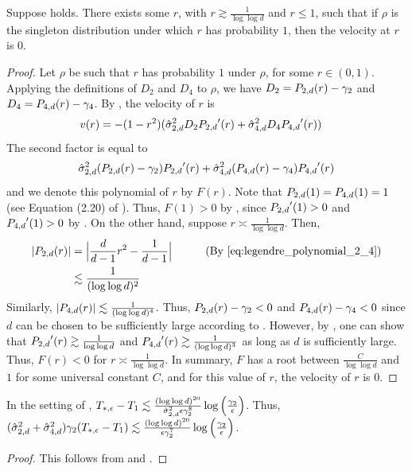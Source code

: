 \begin{lemma} \label{lemma:saddle_point_construction}
Suppose  holds. There exists some $r$, with $r \gtrsim \frac{1}{\log \log d}$ and $r \leq 1$, such that if $\rho$ is the singleton distribution under which $r$ has probability $1$, then the velocity at $r$ is $0.$
\end{lemma}
\begin{proof}
Let $\rho$ be such that $r$ has probability $1$ under $\rho$, for some $r \in (0, 1)$. Applying the definitions of $D_2$ and $D_4$ to $\rho$, we have $D_2 = {P_{2, d}}(r) - \gamma_2$ and $D_4 = {P_{4, d}}(r) - \gamma_4$. By , the velocity of $r$ is
\begin{align}
v(r)
& = -(1 - r^2) (\hat{\sigma}_{2, d}^2 D_2 {P_{2, d}}'(r) + \hat{\sigma}_{4, d}^2 D_4 {P_{4, d}}'(r))
\end{align}
The second factor is equal to
\begin{align}
\hat{\sigma}_{2, d}^2 ({P_{2, d}}(r) - \gamma_2) {P_{2, d}}'(r) + \hat{\sigma}_{4, d}^2 ({P_{4, d}}(r) - \gamma_4) {P_{4, d}}'(r)
\end{align}
and we denote this polynomial of $r$ by $F(r)$. Note that ${P_{2, d}}(1) = {P_{4, d}}(1) = 1$ (see Equation (2.20) of \citet{atkinson2012spherical}). Thus, $F(1) > 0$ by , since ${P_{2, d}}'(1) > 0$ and ${P_{4, d}}'(1) > 0$ by . On the other hand, suppose $r \asymp \frac{1}{\log \log d}$. Then,
\begin{align}
|\PtwoD(r)|
& = \Big|\frac{d}{d - 1} r^2 - \frac{1}{d - 1}\Big|
& \tag{By \Cref{eq:legendre_polynomial_2_4}} \\
& \lesssim \frac{1}{(\log \log d)^2}
\end{align}
Similarly, $|{P_{4, d}}(r)| \lesssim \frac{1}{(\log \log d)^4}$. Thus, ${P_{2, d}}(r) - \gamma_2 < 0$ and ${P_{4, d}}(r) - \gamma_4 < 0$ since $d$ can be chosen to be sufficiently large according to . However, by , one can show that ${P_{2, d}}'(r) \gtrsim \frac{1}{\log \log d}$ and ${P_{4, d}}'(r) \gtrsim \frac{1}{(\log \log d)^3}$ as long as $d$ is sufficiently large. Thus, $F(r) < 0$ for $r \asymp \frac{1}{\log \log d}$. In summary, $F$ has a root between $\frac{C}{\log \log d}$ and $1$ for some universal constant $C$, and for this value of $r$, the velocity of $r$ is $0$.
\end{proof}


\begin{lemma}\label{lemma:time_T_star_minus_T1}
In the setting of , $T_{*, \epsilon} - T_1 \lesssim \frac{(\log \log d)^{20}}{\hat{\sigma}_{2, d}^2 \epsilon \gamma_2^8} \log\Big(\frac{\gamma_2}{\epsilon}\Big)$. Thus, $(\hat{\sigma}_{2, d}^2 + \hat{\sigma}_{4, d}^2) \gamma_2 (T_{*, \epsilon} - T_1) \lesssim \frac{(\log \log d)^{20}}{\epsilon\gamma_2^7} \log\Big(\frac{\gamma_2}{\epsilon}\Big)$.
\end{lemma}
\begin{proof}
This follows from  and .
\end{proof}


